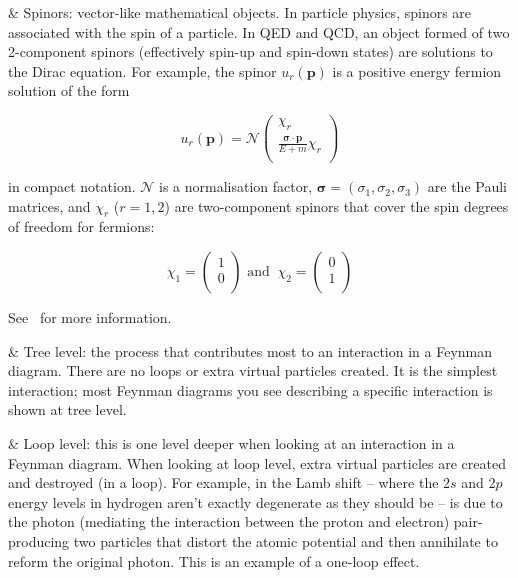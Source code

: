 \begin{easylist}[itemize]
\easylistprops

& Spinors: vector-like mathematical objects. In particle physics, spinors are associated with the spin of a particle. In QED and QCD, an object formed of two 2-component spinors (effectively spin-up and spin-down states) are solutions to the Dirac equation. For example, the spinor $u_r (\mathbf{p})$ is a positive energy fermion solution of the form

\begin{equation}
u_r (\mathbf{p}) = \mathcal{N}
\begin{pmatrix}
\chi_r \\
\frac{ \boldsymbol{\sigma} \cdot \mathbf{p} }{ E + m } \chi_r \\
\end{pmatrix}
\end{equation}

in compact notation. $\mathcal{N}$ is a normalisation factor, $\boldsymbol{\sigma} = (\sigma_1, \sigma_2, \sigma_3)$ are the Pauli matrices, and $\chi_r$ ($r = 1, 2$) are two-component spinors that cover the spin degrees of freedom for fermions:

\begin{equation}
\chi_1 = 
\begin{pmatrix}
1 \\
0 \\
\end{pmatrix}
\textrm{ and } \ 
\chi_2 = 
\begin{pmatrix}
0 \\
1 \\
\end{pmatrix}
\end{equation}

See~\cite{Steane:2013wra} for more information.

& Tree level: the process that contributes most to an interaction in a Feynman diagram. There are no loops or extra virtual particles created. It is the simplest interaction; most Feynman diagrams you see describing a specific interaction is shown at tree level.

& Loop level: this is one level deeper when looking at an interaction in a Feynman diagram. When looking at loop level, extra virtual particles are created and destroyed (in a loop). For example, in the Lamb shift -- where the 2$s$ and 2$p$ energy levels in hydrogen aren't exactly degenerate as they should be -- is due to the photon (mediating the interaction between the proton and electron) pair-producing two particles that distort the atomic potential and then annihilate to reform the original photon. This is an example of a one-loop effect.


\end{easylist}
